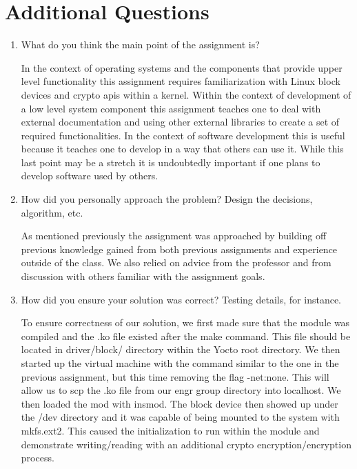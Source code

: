 \documentclass[onecolumn, draftclsnofoot,10pt, compsoc]{IEEEtran}
\begin{document}
\section{Additional Questions}
\begin{enumerate}
    \item What do you think the main point of the assignment is?
    
     \begin{singlespace}
     In the context of operating systems and the components that provide upper level functionality this assignment requires familiarization with Linux block devices and crypto apis within a kernel. Within the context of development of a low level system component this assignment teaches one to deal with external documentation and using other external libraries to create a set of required functionalities. In the context of software development this is useful because it teaches one to develop in a way that others can use it. While this last point may be a stretch it is undoubtedly important if one plans to develop software used by others. 
 
    \end{singlespace}
    
    \item How did you personally approach the problem? Design the decisions, algorithm, etc.
    \begin{singlespace} 
    As mentioned previously the assignment was approached by building off previous knowledge gained from both previous assignments and experience outside of the class. We also relied on advice from the professor and from discussion with others familiar with the assignment goals. 

    
    \end{singlespace}
    
    \item How did you ensure your solution was correct? Testing details, for instance.
    \begin{singlespace} 
    To ensure correctness of our solution, we first made sure that the module was compiled and the .ko file existed after the make command.
    This file should be located in driver/block/ directory within the Yocto root directory.
    We then started up the virtual machine with the command similar to the one in the previous assignment, but this time removing the flag -net:none.
    This will allow us to scp the .ko file from our engr group directory into localhost.
    We then loaded the mod with insmod. The block device then showed up under the /dev directory and it was capable of being mounted to the system with mkfs.ext2.
    This caused the initialization to run within the module and demonstrate writing/reading with an additional crypto encryption/encryption process.


\end{singlespace}
\end{enumerate}
\end{document}
